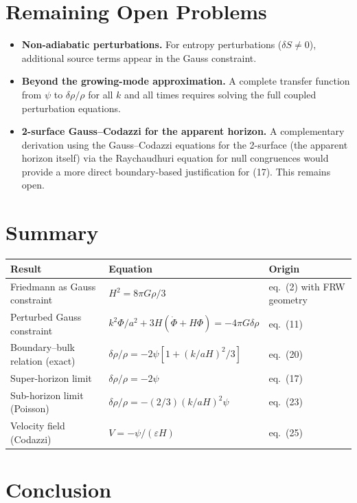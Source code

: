 \documentclass[12pt,a4paper]{article}
\begin{document}
\section{Remaining Open Problems}

\begin{itemize}
  \item \textbf{Non-adiabatic perturbations.} For entropy perturbations ($\delta S \neq 0$), additional source terms appear in the Gauss constraint.

  \item \textbf{Beyond the growing-mode approximation.} A complete transfer function from $\psi$ to $\delta\rho/\rho$ for all $k$ and all times requires solving the full coupled perturbation equations.

  \item \textbf{2-surface Gauss--Codazzi for the apparent horizon.} A complementary derivation using the Gauss--Codazzi equations for the 2-surface (the apparent horizon itself) via the Raychaudhuri equation for null congruences would provide a more direct boundary-based justification for (17). This remains open.
\end{itemize}

\section{Summary}

\begin{table}[h]
\centering
\begin{tabular}{lll}
\toprule
Result & Equation & Origin \\
\midrule
Friedmann as Gauss constraint & $H^2 = 8\pi G\rho/3$ & eq.~(2) with FRW geometry \\
Perturbed Gauss constraint & $k^2\Phi/a^2 + 3H(\dot\Phi+H\Phi) = -4\pi G\delta\rho$ & eq.~(11) \\
Boundary--bulk relation (exact) & $\delta\rho/\rho = -2\psi[1 + (k/aH)^2/3]$ & eq.~(20) \\
Super-horizon limit & $\delta\rho/\rho = -2\psi$ & eq.~(17) \\
Sub-horizon limit (Poisson) & $\delta\rho/\rho = -(2/3)(k/aH)^2\psi$ & eq.~(23) \\
Velocity field (Codazzi) & $V = -\psi/(\varepsilon H)$ & eq.~(25) \\
\bottomrule
\end{tabular}
\end{table}

\section{Conclusion}
\end{document}
